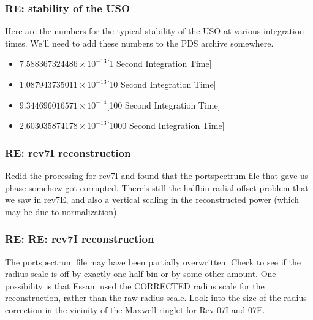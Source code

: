 \documentclass[crop=false,class=book]{standalone}
\begin{document}
\subsubsection{\footnotesize RE: stability of the USO}
Here are the numbers for the typical stability of the USO at various integration times. We'll need to add these numbers to the PDS archive somewhere.
\begin{itemize}
    \item $7.588367324486\times 10^{-13}$\hfill [1 Second Integration Time]
    \item $1.087943735011\times 10^{-13}$\hfill [10 Second Integration Time]
    \item $9.344696016571\times 10^{-14}$\hfill [100 Second Integration Time]
    \item $2.603035874178\times 10^{-13}$\hfill [1000 Second Integration Time]
\end{itemize}
\subsubsection{\footnotesize RE: rev7I reconstruction}
Redid the processing for rev7I and found that the portspectrum file that gave us phase somehow got corrupted. There's still the halfbin radial offset problem that we saw in rev7E, and also a vertical scaling in the reconstructed power (which may be due to normalization).
\subsubsection{\footnotesize RE: RE: rev7I reconstruction}
The portspectrum file may have been partially overwritten. Check to see if the radius scale is off by exactly one half bin or by some other amount. One possibility is that Essam used the CORRECTED radius scale for the reconstruction, rather than the raw radius scale. Look into the size of the radius correction in the vicinity of the Maxwell ringlet for Rev 07I and 07E.
\end{document}
